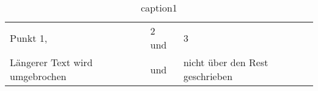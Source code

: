 \begin{table}
\begin{tabular}{p{3cm}p{.5cm}l}
Punkt 1,&2 und&3\\
Längerer Text wird umgebrochen&und&nicht über den Rest geschrieben
\end{tabular}
\caption{caption1}
\end{table}